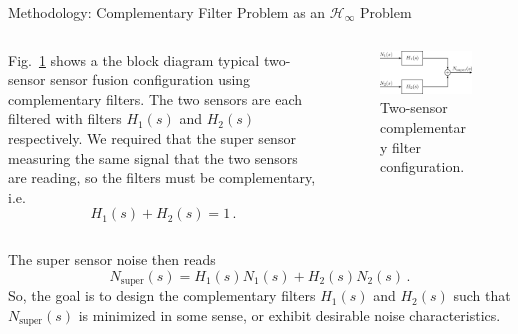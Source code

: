 \documentclass{beamer}
\begin{document}
\begin{frame}[t]
\begin{columns}[t]
\begin{column}{0.32\linewidth}
			\begin{block}{Methodology: Complementary Filter Problem as an $\mathcal{H}_\infty$ Problem}
				\begin{columns}[t, onlytextwidth]
					\begin{column}{0.5\textwidth}
						Fig.~\ref{fig:two-sensor} shows a the block diagram typical two-sensor sensor fusion configuration using complementary filters.
						The two sensors are each filtered with filters $H_1(s)$ and $H_2(s)$ respectively.
						We required that the super sensor measuring the same signal that the two sensors are reading, so the filters must be complementary, i.e.
						\begin{equation}
							H_1(s) + H_2(s) = 1\,.
							\label{eqn:complementary}
						\end{equation}
					\end{column}
					\begin{column}{0.45\textwidth}
						\begin{figure}
							\centering
							\includegraphics[width=1\linewidth]{complementary_filter}
							\caption{Two-sensor complementary filter configuration.}
							\label{fig:two-sensor}
						\end{figure}
					\end{column}
				\end{columns}
			
			\medskip
			
			The super sensor noise then reads
			\begin{equation}
				N_\text{super}(s) = H_1(s)N_1(s) + H_2(s)N_2(s)\,.
				\label{eqn:noise_super}
			\end{equation}
			So, the goal is to design the complementary filters $H_1(s)$ and $H_2(s)$ such that $N_\text{super}(s)$ is minimized in some sense, or exhibit desirable noise characteristics.
			

\end{block}
\end{column}
\end{columns}
\end{frame}
\end{document}
